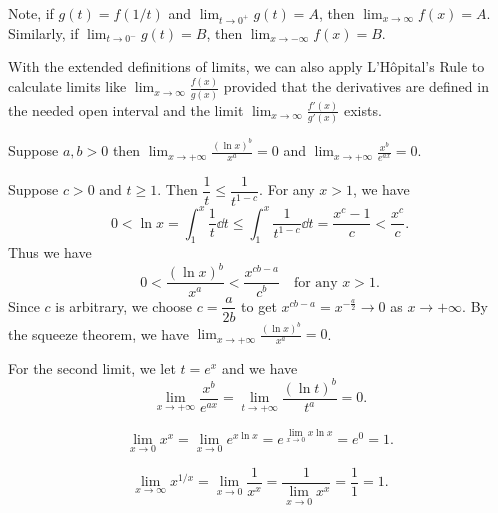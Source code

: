         \begin{remarkenv}
            Note, if $g(t) = f(1/t)$ and $\displaystyle \lim_{t\to 0^+} g(t) = A$, then $\displaystyle \lim_{x\to \infty} f(x) = A$. Similarly, if $\displaystyle \lim_{t\to 0^-} g(t) = B$, then $\displaystyle \lim_{x\to -\infty} f(x) = B$.
        \end{remarkenv}
        \begin{remarkenv}
            With the extended definitions of limits, we can also apply L'Hôpital's Rule to calculate limits like $\displaystyle \lim_{x\to \infty} \frac{f(x)}{g(x)}$ provided that the derivatives are defined in the needed open interval and the limit $\displaystyle \lim_{x\to \infty} \frac{f'(x)}{g'(x)}$ exists.
        \end{remarkenv}
        \begin{theoremenv}
            Suppose $a,b>0$ then $\displaystyle \lim_{x\to +\infty} \frac{(\ln x)^b}{x^a} = 0$ and $\displaystyle \lim_{x\to +\infty} \frac{x^b}{e^{ax}} = 0$.
        \end{theoremenv}
        \begin{proofenv}
            Suppose $c>0$ and $t\ge 1$. Then $\dfrac{1}{t} \le \dfrac{1}{t^{1-c}}$. For any $x>1$, we have
            \[
            0<\ln x = \int_1^x \frac{1}{t} \dd t \le \int_1^x \frac{1}{t^{1-c}} \dd t = \frac{x^c - 1}{c} < \frac{x^c}{c}.
            \]
            Thus we have
            \[
            0 < \frac{(\ln x)^b}{x^a} < \frac{x^{cb-a}}{c^b} \quad \text{for any } x>1.
            \]
            Since $c$ is arbitrary, we choose $c=\dfrac{a}{2b}$ to get $x^{cb-a} = x^{-\frac{a}{2}} \to 0$ as $x\to +\infty$. By the squeeze theorem, we have $\displaystyle \lim_{x\to +\infty} \frac{(\ln x)^b}{x^a} = 0$.

            For the second limit, we let $t=e^x$ and we have
            \[
            \lim_{x\to +\infty} \frac{x^b}{e^{ax}} = \lim_{t\to +\infty} \frac{(\ln t)^b}{t^a} = 0.
            \]
        \end{proofenv}
    \begin{exampleenv}
        \[
        \lim_{x\to 0} x^x = \lim_{x\to 0} e^{x\ln x} = e^{\lim_{x\to 0} x\ln x} = e^0 = 1.
        \]
    \end{exampleenv}
    \begin{exampleenv}
        \[
        \lim_{x\to \infty} x^{1/x} = \lim_{x\to 0} \frac{1}{x^x} = \frac{1}{\displaystyle \lim_{x\to 0} x^x} = \frac{1}{1} = 1.
        \]
    \end{exampleenv}
    \newpage